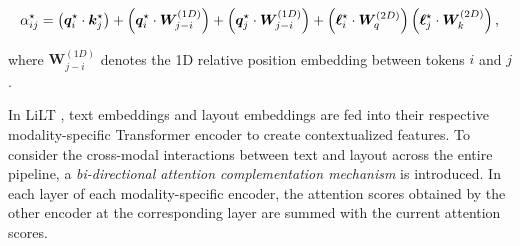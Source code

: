 \begin{equation}
    \alpha^{\star}_{ij} = \left(\bm{q}^{\star}_i \cdot \bm{k}^{\star}_j\right) + \left(\bm{q}^{\star}_i \cdot \bm{W}^{(1D)}_{j-i}\right) + \left(\bm{q}^{\star}_j \cdot \bm{W}^{(1D)}_{j-i}\right) + \left(\boldsymbol{\ell}^{\star}_i \cdot \bm{W}^{(2D)}_q \right) \left(\boldsymbol{\ell}^{\star}_j \cdot \bm{W}^{(2D)}_k \right),
\end{equation}

\noindent where $\bm{W}^{(1D)}_{j-i}$ denotes the 1D relative position embedding between tokens $i$ and $j$.






In \ac{LiLT} \citep{wang2022lilt}, text embeddings and layout embeddings are fed into their respective modality-specific Transformer encoder to create contextualized features. To consider the cross-modal interactions between text and layout across the entire pipeline, a \textit{bi-directional attention complementation mechanism} is introduced. In each layer of each modality-specific encoder, the attention scores obtained by the other encoder at the corresponding layer are summed with the current attention scores.  

